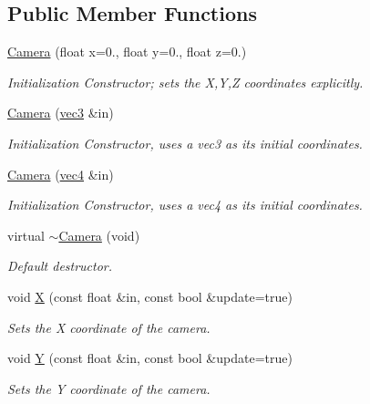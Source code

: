 \subsection*{\-Public \-Member \-Functions}
\begin{DoxyCompactItemize}
\item 
\hyperlink{class_camera_a47104bf17f448c97bf7bb34360ab8fcc}{\-Camera} (float x=0., float y=0., float z=0.)
\begin{DoxyCompactList}\small\item\em \-Initialization \-Constructor; sets the \-X,\-Y,\-Z coordinates explicitly. \end{DoxyCompactList}\item 
\hyperlink{class_camera_a388c39247312dc6850b2d1b007efb423}{\-Camera} (\hyperlink{struct_angel_1_1vec3}{vec3} \&in)
\begin{DoxyCompactList}\small\item\em \-Initialization \-Constructor, uses a vec3 as its initial coordinates. \end{DoxyCompactList}\item 
\hyperlink{class_camera_a30b637b0e81821106c16a8a299d24d3f}{\-Camera} (\hyperlink{struct_angel_1_1vec4}{vec4} \&in)
\begin{DoxyCompactList}\small\item\em \-Initialization \-Constructor, uses a vec4 as its initial coordinates. \end{DoxyCompactList}\item 
virtual \hyperlink{class_camera_a06211f202c145b3ec8253f96e1e654a6}{$\sim$\-Camera} (void)
\begin{DoxyCompactList}\small\item\em \-Default destructor. \end{DoxyCompactList}\item 
void \hyperlink{class_camera_a7ff7cf14bee873ac6cda7b2e42a60358}{\-X} (const float \&in, const bool \&update=true)
\begin{DoxyCompactList}\small\item\em \-Sets the \-X coordinate of the camera. \end{DoxyCompactList}\item 
void \hyperlink{class_camera_a69af560bb7f85db3a5062d1a6b3927bf}{\-Y} (const float \&in, const bool \&update=true)
\begin{DoxyCompactList}\small\item\em \-Sets the \-Y coordinate of the camera. \end{DoxyCompactList}\item 

\end{DoxyCompactItemize}
